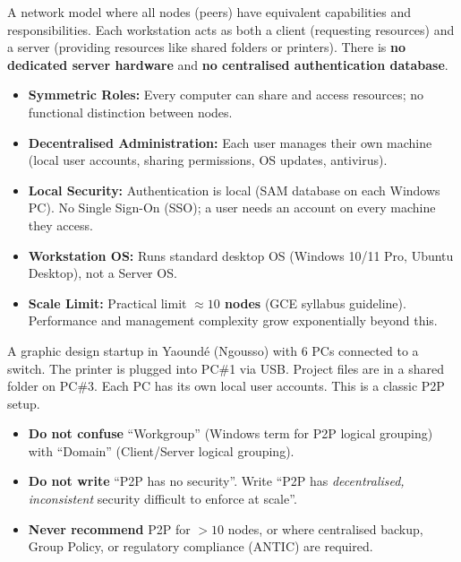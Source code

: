 \documentclass[11pt]{article}
\newcommand{\cle}[1]{{\popxbold\color{popdark}#1}}
\newcounter{popsec}
\newcounter{popsub}
\newcommand{\courssub}[1]{%
  \stepcounter{popsub}%
  \par\vspace{9pt}\noindent{\popxbold\fontsize{11.5}{13}\selectfont\color{popink}{\color{poporange}\thepopsec.\thepopsub}\hspace{6pt}#1}\par\nopagebreak\vspace{4pt}
}
\begin{document}
\courssub{Peer-to-Peer Architecture}

\begin{definition}
A network model where all nodes (\cle{peers}) have equivalent capabilities and responsibilities. Each workstation acts as both a \cle{client} (requesting resources) and a \cle{server} (providing resources like shared folders or printers). There is \textbf{no dedicated server hardware} and \textbf{no centralised authentication database}.
\end{definition}

\begin{propriete}[Characteristics of P2P]
\begin{itemize}
    \item \textbf{Symmetric Roles:} Every computer can share and access resources; no functional distinction between nodes.
    \item \textbf{Decentralised Administration:} Each user manages their own machine (local user accounts, sharing permissions, OS updates, antivirus).
    \item \textbf{Local Security:} Authentication is local (SAM database on each Windows PC). No Single Sign-On (SSO); a user needs an account on every machine they access.
    \item \textbf{Workstation OS:} Runs standard desktop OS (Windows 10/11 Pro, Ubuntu Desktop), not a Server OS.
    \item \textbf{Scale Limit:} Practical limit \textbf{$\approx 10$ nodes} (GCE syllabus guideline). Performance and management complexity grow exponentially beyond this.
\end{itemize}
\end{propriete}

\begin{exemplebox}
A graphic design startup in Yaoundé (Ngousso) with 6 PCs connected to a switch. The printer is plugged into PC\#1 via USB. Project files are in a shared folder on PC\#3. Each PC has its own local user accounts. This is a classic P2P setup.
\end{exemplebox}

\begin{attention}
\begin{itemize}
    \item \textbf{Do not confuse} ``Workgroup'' (Windows term for P2P logical grouping) with ``Domain'' (Client/Server logical grouping).
    \item \textbf{Do not write} ``P2P has no security''. Write ``P2P has \emph{decentralised, inconsistent} security difficult to enforce at scale''.
    \item \textbf{Never recommend} P2P for $>10$ nodes, or where centralised backup, Group Policy, or regulatory compliance (ANTIC) are required.
\end{itemize}
\end{attention}
\end{document}
